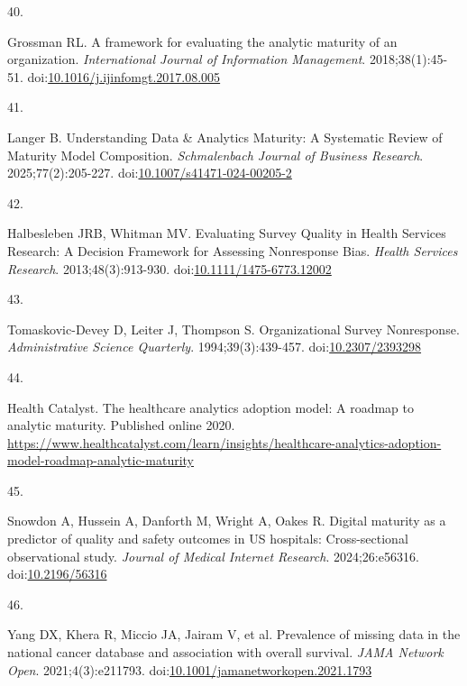 \documentclass[
  american,
  11pt,
  letterpaper,
  oneside  ,captions=tableheading
]{scrartcl}
\newlength{\cslhangindent}
\newlength{\csllabelwidth}
\newenvironment{CSLReferences}[2] %
 {\begin{list}{}{%
  \setlength{\itemindent}{0pt}
  \setlength{\leftmargin}{0pt}
  \setlength{\parsep}{0pt}
  \ifodd #1
   \setlength{\leftmargin}{\cslhangindent}
   \setlength{\itemindent}{-1\cslhangindent}
  \fi
  \setlength{\itemsep}{#2\baselineskip}}}
 {\end{list}}
\newcommand{\CSLLeftMargin}[1]{\parbox[t]{\csllabelwidth}{\strut#1\strut}}
\newcommand{\CSLRightInline}[1]{\parbox[t]{\linewidth - \csllabelwidth}{\strut#1\strut}}
\begin{document}
\begin{CSLReferences}{0}{1}
\CSLLeftMargin{40. }%
\CSLRightInline{Grossman RL. {A framework for evaluating the analytic
maturity of an organization}. \emph{International Journal of Information
Management}. 2018;38(1):45-51.
doi:\href{https://doi.org/10.1016/j.ijinfomgt.2017.08.005}{10.1016/j.ijinfomgt.2017.08.005}}

\CSLLeftMargin{41. }%
\CSLRightInline{Langer B. {Understanding Data \& Analytics Maturity: A
Systematic Review of Maturity Model Composition}. \emph{Schmalenbach
Journal of Business Research}. 2025;77(2):205-227.
doi:\href{https://doi.org/10.1007/s41471-024-00205-2}{10.1007/s41471-024-00205-2}}

\CSLLeftMargin{42. }%
\CSLRightInline{Halbesleben JRB, Whitman MV. {Evaluating Survey Quality
in Health Services Research: A Decision Framework for Assessing
Nonresponse Bias}. \emph{Health Services Research}. 2013;48(3):913-930.
doi:\href{https://doi.org/10.1111/1475-6773.12002}{10.1111/1475-6773.12002}}

\CSLLeftMargin{43. }%
\CSLRightInline{Tomaskovic-Devey D, Leiter J, Thompson S.
{Organizational Survey Nonresponse}. \emph{Administrative Science
Quarterly}. 1994;39(3):439-457.
doi:\href{https://doi.org/10.2307/2393298}{10.2307/2393298}}

\CSLLeftMargin{44. }%
\CSLRightInline{Health Catalyst. {The healthcare analytics adoption
model: A roadmap to analytic maturity}. Published online 2020.
\url{https://www.healthcatalyst.com/learn/insights/healthcare-analytics-adoption-model-roadmap-analytic-maturity}}

\CSLLeftMargin{45. }%
\CSLRightInline{Snowdon A, Hussein A, Danforth M, Wright A, Oakes R.
{Digital maturity as a predictor of quality and safety outcomes in {US}
hospitals: Cross-sectional observational study}. \emph{Journal of
Medical Internet Research}. 2024;26:e56316.
doi:\href{https://doi.org/10.2196/56316}{10.2196/56316}}

\CSLLeftMargin{46. }%
\CSLRightInline{{Yang DX, Khera R, Miccio JA, Jairam V, et al.}
{Prevalence of missing data in the national cancer database and
association with overall survival}. \emph{JAMA Network Open}.
2021;4(3):e211793.
doi:\href{https://doi.org/10.1001/jamanetworkopen.2021.1793}{10.1001/jamanetworkopen.2021.1793}}


\end{CSLReferences}
\end{document}
